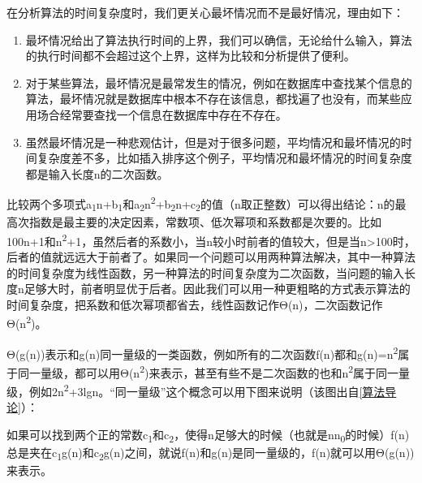 在分析算法的时间复杂度时，我们更关心最坏情况而不是最好情况，理由如下：


\begin{enumerate}

\item 最坏情况给出了算法执行时间的上界，我们可以确信，无论给什么输入，算法的执行时间都不会超过这个上界，这样为比较和分析提供了便利。

\item 对于某些算法，最坏情况是最常发生的情况，例如在数据库中查找某个信息的算法，最坏情况就是数据库中根本不存在该信息，都找遍了也没有，而某些应用场合经常要查找一个信息在数据库中存在不存在。

\item 虽然最坏情况是一种悲观估计，但是对于很多问题，平均情况和最坏情况的时间复杂度差不多，比如插入排序这个例子，平均情况和最坏情况的时间复杂度都是输入长度n的二次函数。
\end{enumerate}


比较两个多项式a\textsubscript{1}n+\BookSplit{}b\textsubscript{1}和a\textsubscript{2}n\textsuperscript{2}+b\textsubscript{2}n+\BookSplit{}c\textsubscript{2}的值（n取正整数）可以得出结论：n的最高次指数是最主要的决定因素，常数项、低次幂项和系数都是次要的。比如100n+\BookSplit{}1和n\textsuperscript{2}+1，虽然后者的系数小，当n较小时前者的值较大，但是当n\textgreater{}100时，后者的值就远远大于前者了。如果同一个问题可以用两种算法解决，其中一种算法的时间复杂度为线性函数，另一种算法的时间复杂度为二次函数，当问题的输入长度n足够大时，前者明显优于后者。因此我们可以用一种更粗略的方式表示算法的时间复杂度，把系数和低次幂项都省去，线性函数记作Θ(n)，二次函数记作Θ(n\textsuperscript{2})。



Θ(g(n))表示和g(n)同一量级的一类函数，例如所有的二次函数f(n)都和g(n)=n\textsuperscript{2}属于同一量级，都可以用Θ(n\textsuperscript{2})来表示，甚至有些不是二次函数的也和n\textsuperscript{2}属于同一量级，例如2n\textsuperscript{2}+3lgn。“同一量级”这个概念可以用下图来说明（该图出自\hyperlink{db.bi01.bibli.algorithm}{[算法导论]}）：




如果可以找到两个正的常数c\textsubscript{1}和c\textsubscript{2}，使得n足够大的时候（也就是nn\textsubscript{0}的时候）f(n)总是夹在c\textsubscript{1}g(n)和c\textsubscript{2}g(n)之间，就说f(n)和g(n)是同一量级的，f(n)就可以用Θ(g(n))来表示。




